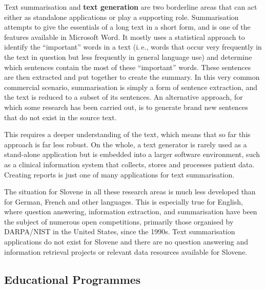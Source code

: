 \begin{multicols}{2}
    Text summarisation and \textbf{text generation} are two borderline areas that can act either as standalone applications or play a supporting role. Summarisation attempts to give the essentials of a long text in a short form, and is one of the features available in Microsoft Word. It mostly uses a statistical approach to identify the “important” words in a text (i.\,e., words that occur very frequently in the text in question but less frequently in general language use) and determine which sentences contain the most of these “important” words. These sentences are then extracted and put together to create the summary. In this very common commercial scenario, summarisation is simply a form of sentence extraction, and the text is reduced to a subset of its sentences. An alternative approach, for which some research has been carried out, is to generate brand new sentences that do not exist in the source text. 

This requires a deeper understanding of the text, which means that so far this approach is far less robust. On the whole, a text generator is rarely used as a stand-alone application but is embedded into a larger software environment, such as a clinical information system that collects, stores and processes patient data. Creating reports is just one of many applications for text summarisation. 



The situation for Slovene in all these research areas is much less developed than for German, French and other languages. This is especially true for English, where question answering, information extraction, and summarisation have been the subject of numerous open competitions, primarily those organised by DARPA/NIST in the United States, since the 1990s. Text summarisation applications do not exist for Slovene and there are no question answering and information retrieval projects or relevant data resources available for Slovene.

\subsection{Educational Programmes}


\end{multicols}
